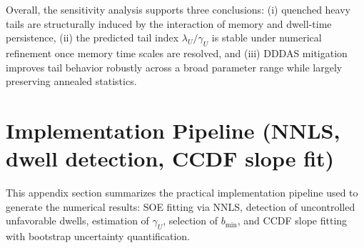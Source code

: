 \documentclass[12pt,a4paper]{article}
\theoremstyle{definition}
\theoremstyle{remark}
\begin{document}
Overall, the sensitivity analysis supports three conclusions:
(i) quenched heavy tails are structurally induced by the interaction of memory and dwell-time persistence,
(ii) the predicted tail index $\lambda_U/\gamma_U$ is stable under numerical refinement once memory time scales are resolved, and
(iii) DDDAS mitigation improves tail behavior robustly across a broad parameter range while largely preserving annealed statistics.

\section{Implementation Pipeline (NNLS, dwell detection, CCDF slope fit)}
\label{app:implementation}

This appendix section summarizes the practical implementation pipeline used to generate the numerical results:
SOE fitting via NNLS, detection of uncontrolled unfavorable dwells, estimation of $\gamma_U$, selection of $b_{\min}$, and CCDF slope fitting with bootstrap uncertainty quantification.
\end{document}
